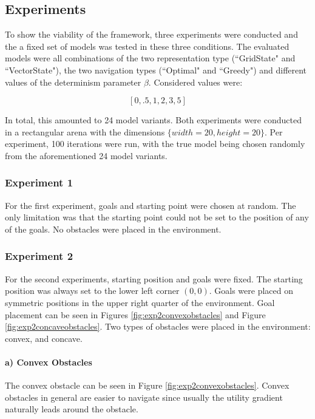 \subsection{Experiments}
To show the viability of the framework, three experiments were conducted and the a fixed set of models was tested in these three conditions.
The evaluated models were all combinations of the two representation type (``GridState" and ``VectorState"), the two navigation types (``Optimal" and ``Greedy") and different values of the determinism parameter $\beta$.
Considered values were:

\[
[0,.5,1,2,3,5]
\]

In total, this amounted to 24 model variants.
Both experiments were conducted in a rectangular arena with the dimensions $\{width=20, height=20\}$.
Per experiment, 100 iterations were run, with the true model being chosen randomly from the aforementioned 24 model variants.

\subsubsection{Experiment 1}
For the first experiment, goals and starting point were chosen at random. The only limitation was that the starting point could not be set to the position of any of the goals.
No obstacles were placed in the environment.

\subsubsection{Experiment 2}
For the second experiments, starting position and goals were fixed.
The starting position was always set to the lower left corner $(0,0)$. Goals were placed on symmetric positions in the upper right quarter of the environment.
Goal placement can be seen in Figures \ref{fig:exp2convexobstacles} and Figure \ref{fig:exp2concaveobstacles}.
Two types of obstacles were placed in the environment: convex, and concave.

\paragraph{a) Convex Obstacles}
The convex obstacle can be seen in Figure \ref{fig:exp2convexobstacles}.
Convex obstacles in general are easier to navigate since usually the utility gradient naturally leads around the obstacle.

